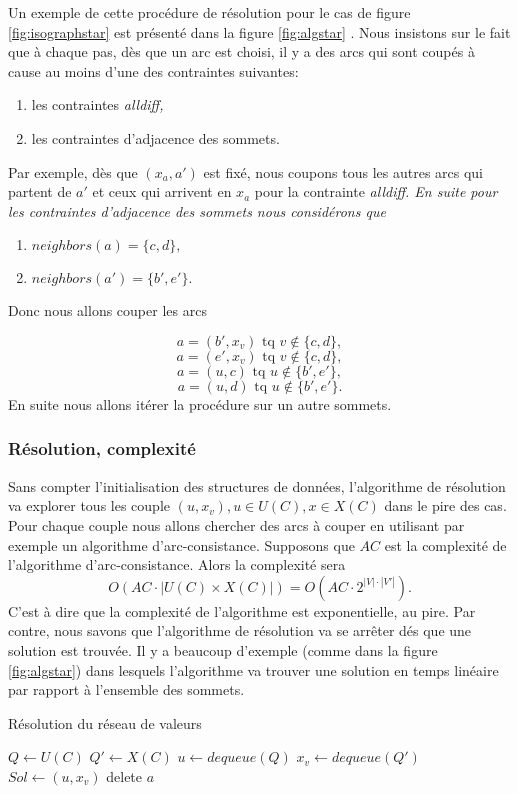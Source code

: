 \documentclass[french]{article}
\theoremstyle{definition}
\theoremstyle{remark}
\begin{document}
Un exemple de cette procédure de résolution pour le cas de figure \ref{fig:isographstar} est présenté dans la figure \ref{fig:algstar} . Nous insistons sur le fait que à chaque pas, dès que un arc est choisi, il y a des arcs qui sont coupés à cause au moins d'une des contraintes suivantes:
\begin{enumerate}
	\item les contraintes \it alldiff, \rm
	\item les contraintes d'adjacence des sommets.
\end{enumerate}
Par exemple, dès que $(x_a, a')$ est fixé, nous coupons tous les autres arcs qui partent de $a'$ et ceux qui arrivent en $x_a$ pour la contrainte \it alldiff. \rm En suite pour les contraintes d'adjacence des sommets nous considérons que
\begin{enumerate}
	\item $neighbors(a)=\{c, d\},$
	\item $neighbors(a')=\{b', e'\}.$
\end{enumerate}
Donc nous allons couper les arcs

$$ a=(b', x_v) \text{ tq } v \notin \{c,d\} , $$
$$ a=(e', x_v) \text{ tq } v \notin \{c,d\}, $$
$$ a=(u, c) \text{ tq } u \notin \{b',e'\}, $$
$$ a=(u, d) \text{ tq } u \notin \{b',e'\}. $$
En suite nous allons itérer la procédure sur un autre sommets. 

\subsubsection{Résolution, complexité}
Sans compter l'initialisation des structures de données, l'algorithme de résolution va explorer tous les couple $(u, x_v), u \in U(C), x \in X(C)$ dans le pire des cas. Pour chaque couple nous allons chercher des arcs à couper en utilisant par exemple un algorithme d'arc-consistance. Supposons que $AC$ est la complexité de l'algorithme d'arc-consistance.  
Alors la complexité sera $$O(AC \cdot |U(C) \times X(C)|)=O(AC \cdot 2^{|V| \cdot |V'|}).$$
C'est à dire que la complexité de l'algorithme est exponentielle, au pire.
Par contre, nous savons que l'algorithme de résolution va se arrêter dés que une solution est trouvée. Il y a beaucoup d'exemple (comme dans la figure \ref{fig:algstar}) dans lesquels l'algorithme va trouver une solution en temps linéaire par rapport à l'ensemble des sommets.

\begin{algorithm}
	\caption{Résolution du réseau de valeurs}
	\begin{algorithmic}[1]
		\State $Q \gets U(C)$
		\State $Q' \gets X(C)$
		\State $u \gets dequeue(Q)$
		\State $x_v \gets dequeue(Q')$
		\State $Sol \gets (u, x_v) $ 
		\State delete $a$
		\EndIf
		\EndFor
		\EndWhile
	\end{algorithmic}
\end{algorithm}
\end{document}
